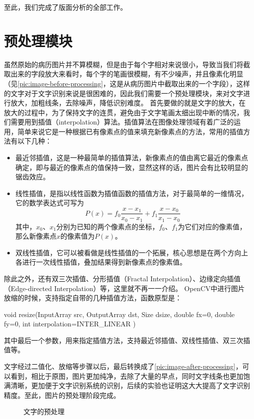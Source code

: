 至此，我们完成了版面分析的全部工作。

\section{预处理模块}     %
虽然原始的病历图片并不算模糊，但是由于每个字相对来说很小，导致当我们将截取出来的字段放大来看时，每个字的笔画很模糊，有不少噪声，并且像素化明显（见\autoref{pic:image-before-processing}，这是从病历图片中截取出来的一个字段），这样的文字对于文字识别来说是很困难的，因此我们需要一个预处理模块，来对文字进行放大，加粗线条，去除噪声，降低识别难度。
首先要做的就是文字的放大，在放大的过程中，为了保持文字的连贯，避免由于文字笔画太细出现中断的情况，我们需要用到插值（interpolation）算法。插值算法在图像处理领域有着广泛的运用\citep{thevenaz2000image}，简单来说它是一种根据已有像素点的值来填充新像素点的方法，常用的插值方法有以下几种：
\begin{itemize}
	\item 最近邻插值，这是一种最简单的插值算法，新像素点的值由离它最近的像素点确定，即与最近的像素点的值保持一致，显然这样的话，图片会有比较明显的锯齿效应。
	\item 线性插值，是指以线性函数为插值函数的插值方法，对于最简单的一维情况，它的数学表达式可写为
		\begin{equation}
			P(x) = f_0\frac{x-x_1}{x_0-x_1}+f_1\frac{x-x_0}{x_1-x_0}
		\end{equation}
		其中，$x_0$、$x_1$分别为已知的两个像素点的坐标，$f_0$、$f_1$为它们对应的像素值，那么新像素点$x$的像素值为$P(x)$。
	\item 双线性插值，它可以被看做是线性插值的一个拓展，核心思想是在两个方向上各进行一次线性插值，叠加结果得到新像素点的像素值。
\end{itemize}
除此之外，还有双三次插值、分形插值（Fractal Interpolation）\citep{barnsley1986fractal}、边缘定向插值（Edge-directed Interpolation）\citep{li2001new}等，这里就不再一一介绍。
OpenCV中进行图片放缩的时候，支持指定自带的几种插值方法，函数原型是：
\begin{Code}
void resize(InputArray src, OutputArray dst, Size dsize, double fx=0, double fy=0, int interpolation=INTER_LINEAR )
\end{Code}
其中最后一个参数，用来指定插值方法，支持最近邻插值、双线性插值、双三次插值等。

文字经过二值化、放缩等步骤以后，最后转换成了\autoref{pic:image-after-processing}，可以看到，相比于原图，图片更加纯净，去除了大量的早点，同时文字线条也更加饱满清晰，更加便于文字识别系统的识别，后续的实验也证明这大大提高了文字识别精度。至此，图片的预处理阶段完成。
\begin{figure}[htbp]
  \centering
	\hfill
  \caption{文字的预处理}
  \label{pic:pre-processing}
\end{figure}

